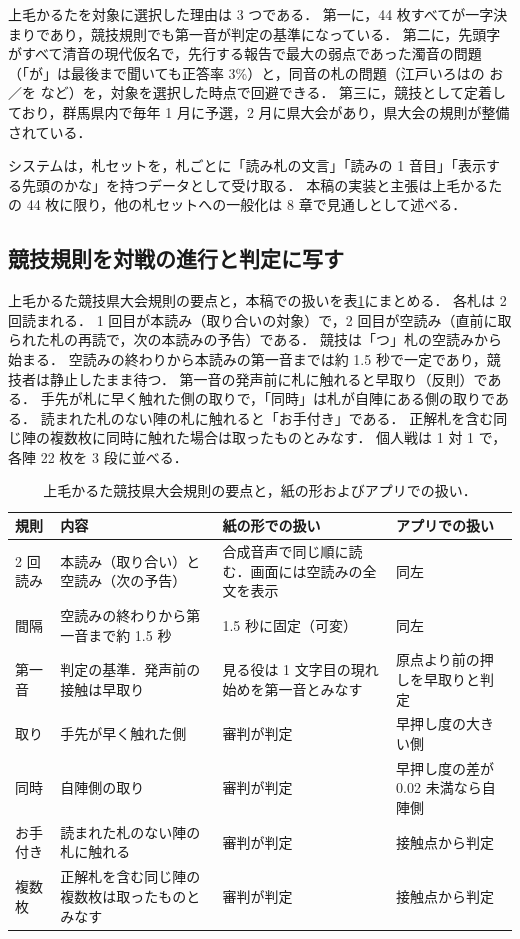 上毛かるたを対象に選択した理由は 3 つである．
第一に，44 枚すべてが一字決まりであり，競技規則でも第一音が判定の基準になっている．
第二に，先頭字がすべて清音の現代仮名で，先行する報告で最大の弱点であった濁音の問題（「が」は最後まで聞いても正答率 3\%）と，同音の札の問題（江戸いろはの お／を など）を，対象を選択した時点で回避できる．
第三に，競技として定着しており，群馬県内で毎年 1 月に予選，2 月に県大会があり，県大会の規則が整備されている．

システムは，札セットを，札ごとに「読み札の文言」「読みの 1 音目」「表示する先頭のかな」を持つデータとして受け取る．
本稿の実装と主張は上毛かるたの 44 枚に限り，他の札セットへの一般化は 8 章で見通しとして述べる．

\subsection{競技規則を対戦の進行と判定に写す}

上毛かるた競技県大会規則\cite{jomo_rules}の要点と，本稿での扱いを表\ref{tab:rules}にまとめる．
各札は 2 回読まれる．
1 回目が本読み（取り合いの対象）で，2 回目が空読み（直前に取られた札の再読で，次の本読みの予告）である．
競技は「つ」札の空読みから始まる．
空読みの終わりから本読みの第一音までは約 1.5 秒で一定であり，競技者は静止したまま待つ．
第一音の発声前に札に触れると早取り（反則）である．
手先が札に早く触れた側の取りで，「同時」は札が自陣にある側の取りである．
読まれた札のない陣の札に触れると「お手付き」である．
正解札を含む同じ陣の複数枚に同時に触れた場合は取ったものとみなす．
個人戦は 1 対 1 で，各陣 22 枚を 3 段に並べる．

\begin{table}[tb]
\caption{上毛かるた競技県大会規則\cite{jomo_rules}の要点と，紙の形およびアプリでの扱い．}
\label{tab:rules}
\centering
\small
\begin{tabular}{p{1.4cm}p{4.8cm}p{5.0cm}p{4.5cm}}
\hline\hline
規則 & 内容 & 紙の形での扱い & アプリでの扱い \\
\hline
2 回読み & 本読み（取り合い）と空読み（次の予告） & 合成音声で同じ順に読む．画面には空読みの全文を表示 & 同左 \\
間隔 & 空読みの終わりから第一音まで約 1.5 秒 & 1.5 秒に固定（可変） & 同左 \\
第一音 & 判定の基準．発声前の接触は早取り & 見る役は 1 文字目の現れ始めを第一音とみなす & 原点より前の押しを早取りと判定 \\
取り & 手先が早く触れた側 & 審判が判定 & 早押し度の大きい側 \\
同時 & 自陣側の取り & 審判が判定 & 早押し度の差が 0.02 未満なら自陣側 \\
お手付き & 読まれた札のない陣の札に触れる & 審判が判定 & 接触点から判定 \\
複数枚 & 正解札を含む同じ陣の複数枚は取ったものとみなす & 審判が判定 & 接触点から判定 \\
\hline
\end{tabular}
\end{table}

